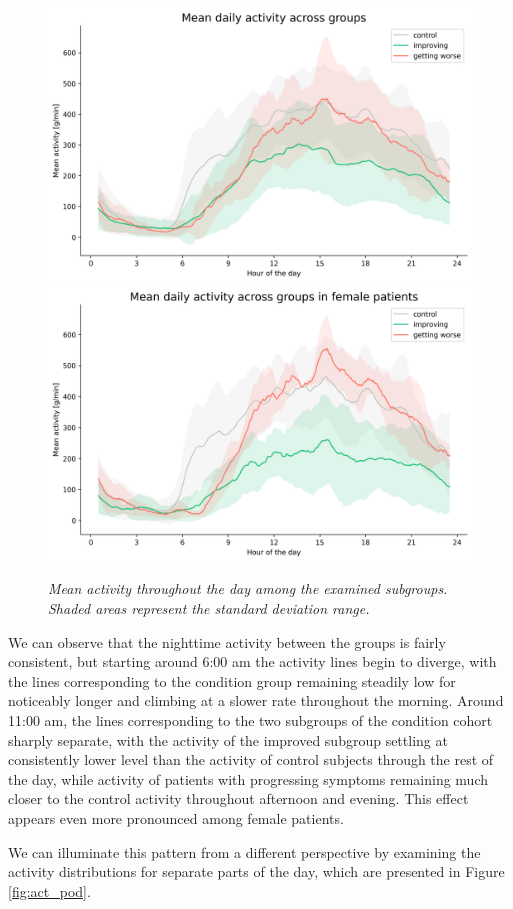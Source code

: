 \documentclass[12pt]{article}
\begin{document}
\begin{figure}[!t]
    \centering
    \includegraphics[width=.75\textwidth]{images/mean_act_agg.png}
    \includegraphics[width=.75\textwidth]{images/mean_act_agg_fe.png}
    \captionsetup{justification=centering}
    \caption{\textit{Mean activity throughout the day among the examined subgroups. Shaded areas represent the standard deviation range.}}
    \label{fig:daily_act_agg}
\end{figure}

We can observe that the nighttime activity between the groups is fairly consistent, but starting around 6:00 am the activity lines begin to diverge, with the lines corresponding to the condition group remaining steadily low for noticeably longer and climbing at a slower rate throughout the morning. Around 11:00 am, the lines corresponding to the two subgroups of the condition cohort sharply separate, with the activity of the improved subgroup settling at consistently lower level than the activity of control subjects through the rest of the day, while activity of patients with progressing symptoms remaining much closer to the control activity throughout afternoon and evening. This effect appears even more pronounced among female patients.

We can illuminate this pattern from a different perspective by examining the activity distributions for separate parts of the day, which are presented in Figure \ref{fig:act_pod}. 
\end{document}
